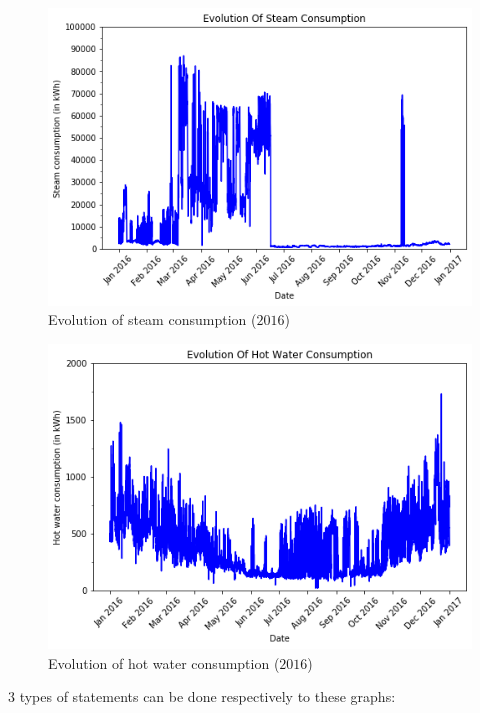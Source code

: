 \documentclass[twocolumn, switch]{article}
\begin{document}
\begin{figure}[H]
\centering
\includegraphics[scale=0.35]{../graphs/evolution_steam_consumption}
\caption{Evolution of steam consumption ($2016$)}
\label{fig:evolution_steam_consumption}
\end{figure}

\begin{figure}[H]
\centering
\includegraphics[scale=0.35]{../graphs/evolution_hot_water_consumption}
\caption{Evolution of hot water consumption ($2016$)}
\label{fig:evolution_hot_water_consumption}
\end{figure}

$3$ types of statements can be done respectively to these graphs:
\end{document}
